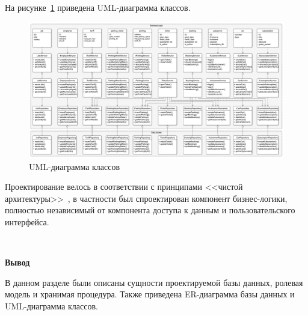 На рисунке~\ref{fig:uml} приведена UML-диаграмма классов.
\begin{figure}[h]
	\centering
	\includegraphics[height=0.6\textheight, width=1.1\textwidth, angle=90]{svg/UML}
	\caption{UML-диаграмма классов}
	\label{fig:uml}
\end{figure}

Проектирование велось в соответствии с принципами <<чистой архитектуры>>~\cite{martin}, в частности был спроектирован компонент бизнес-логики, полностью независимый от компонента доступа к данным и пользовательского интерфейса.

~

\textbf{Вывод}

В данном разделе были описаны сущности проектируемой базы данных, ролевая модель и хранимая процедура. Также приведена ER-диаграмма базы данных и UML-диаграмма классов.
